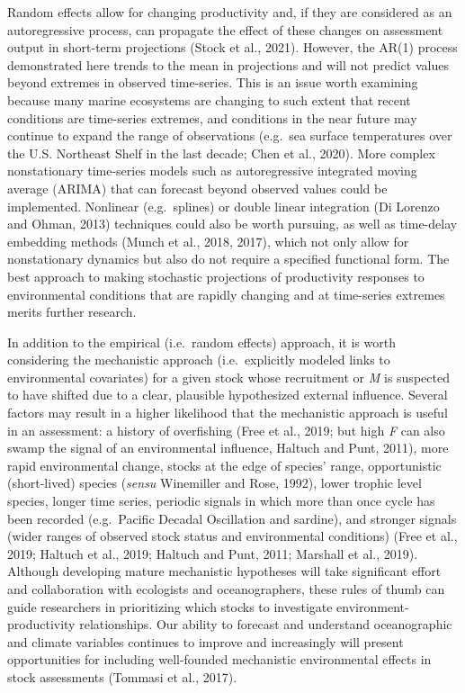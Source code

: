 \documentclass[]{article}
\begin{document}
Random effects allow for changing productivity and, if they are
considered as an autoregressive process, can propagate the effect of
these changes on assessment output in short-term projections (Stock et
al., 2021). However, the AR(1) process demonstrated here trends to the
mean in projections and will not predict values beyond extremes in
observed time-series. This is an issue worth examining because many
marine ecosystems are changing to such extent that recent conditions are
time-series extremes, and conditions in the near future may continue to
expand the range of observations (e.g.~sea surface temperatures over the
U.S. Northeast Shelf in the last decade; Chen et al., 2020). More
complex nonstationary time-series models such as autoregressive
integrated moving average (ARIMA) that can forecast beyond observed
values could be implemented. Nonlinear (e.g.~splines) or double linear
integration (Di Lorenzo and Ohman, 2013) techniques could also be worth
pursuing, as well as time-delay embedding methods (Munch et al., 2018,
2017), which not only allow for nonstationary dynamics but also do not
require a specified functional form. The best approach to making
stochastic projections of productivity responses to environmental
conditions that are rapidly changing and at time-series extremes merits
further research.

In addition to the empirical (i.e.~random effects) approach, it is worth
considering the mechanistic approach (i.e.~explicitly modeled links to
environmental covariates) for a given stock whose recruitment or
\emph{M} is suspected to have shifted due to a clear, plausible
hypothesized external influence. Several factors may result in a higher
likelihood that the mechanistic approach is useful in an assessment: a
history of overfishing (Free et al., 2019; but high \emph{F} can also
swamp the signal of an environmental influence, Haltuch and Punt, 2011),
more rapid environmental change, stocks at the edge of species' range,
opportunistic (short-lived) species (\emph{sensu} Winemiller and Rose,
1992), lower trophic level species, longer time series, periodic signals
in which more than once cycle has been recorded (e.g.~Pacific Decadal
Oscillation and sardine), and stronger signals (wider ranges of observed
stock status and environmental conditions) (Free et al., 2019; Haltuch
et al., 2019; Haltuch and Punt, 2011; Marshall et al., 2019). Although
developing mature mechanistic hypotheses will take significant effort
and collaboration with ecologists and oceanographers, these rules of
thumb can guide researchers in prioritizing which stocks to investigate
environment-productivity relationships. Our ability to forecast and
understand oceanographic and climate variables continues to improve and
increasingly will present opportunities for including well-founded
mechanistic environmental effects in stock assessments (Tommasi et al.,
2017).
\end{document}
